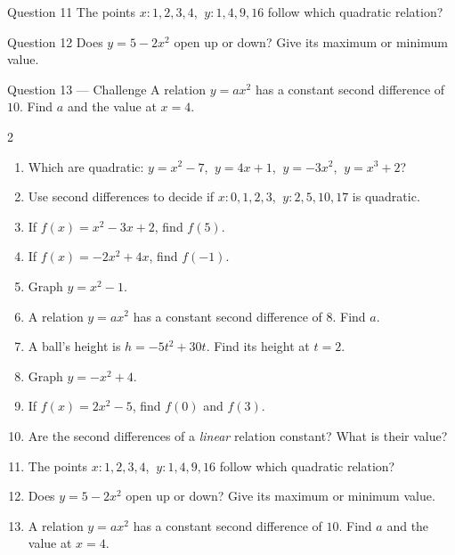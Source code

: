 \documentclass[11pt]{article}
\begin{document}
\begin{qbox}{Question 11}
The points $x:1,2,3,4$, $\ y:1,4,9,16$ follow which quadratic relation?\workspace{2.0cm}
\end{qbox}

\begin{qbox}{Question 12}
Does $y=5-2x^2$ open up or down? Give its maximum or minimum value.\workspace{2.0cm}
\end{qbox}

\begin{qbox}{Question 13 --- Challenge}
A relation $y=ax^2$ has a constant second difference of $10$. Find $a$ and the value at $x=4$.\workspace{2.6cm}
\end{qbox}

\clearpage
{}

\begin{recapbox}
\begin{multicols}{2}
\small
\begin{enumerate}[leftmargin=*,itemsep=3pt]
  \item Which are quadratic: $y=x^2-7$, $\ y=4x+1$, $\ y=-3x^2$, $\ y=x^3+2$?
  \item Use second differences to decide if $x:0,1,2,3$, $\ y:2,5,10,17$ is quadratic.
  \item If $f(x)=x^2-3x+2$, find $f(5)$.
  \item If $f(x)=-2x^2+4x$, find $f(-1)$.
  \item Graph $y=x^2-1$.
  \item A relation $y=ax^2$ has a constant second difference of $8$. Find $a$.
  \item A ball's height is $h=-5t^2+30t$. Find its height at $t=2$.
  \item Graph $y=-x^2+4$.
  \item If $f(x)=2x^2-5$, find $f(0)$ and $f(3)$.
  \item Are the second differences of a \emph{linear} relation constant? What is their value?
  \item The points $x:1,2,3,4$, $\ y:1,4,9,16$ follow which quadratic relation?
  \item Does $y=5-2x^2$ open up or down? Give its maximum or minimum value.
  \item A relation $y=ax^2$ has a constant second difference of $10$. Find $a$ and the value at $x=4$.
\end{enumerate}
\end{multicols}
\end{recapbox}
\end{document}
